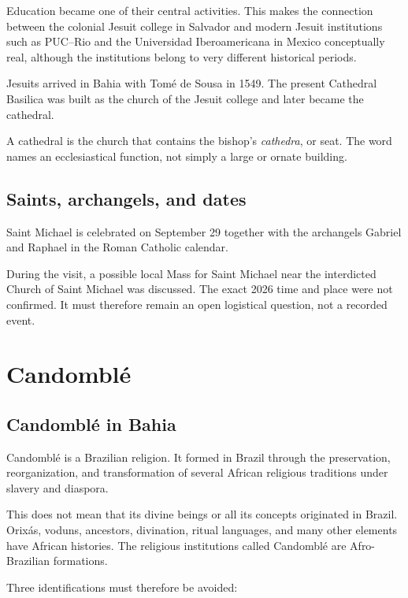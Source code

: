 Education became one of their central
activities.  This makes the connection
between the colonial Jesuit college in
Salvador and modern Jesuit institutions
such as PUC--Rio and the Universidad
Iberoamericana in Mexico conceptually
real, although the institutions belong to
very different historical periods.

Jesuits arrived in Bahia with Tom\'e de
Sousa in 1549.  The present Cathedral
Basilica was built as the church of the
Jesuit college and later became the
cathedral.

A cathedral is the church that contains
the bishop's \emph{cathedra}, or seat.  The
word names an ecclesiastical function,
not simply a large or ornate building.

\subsection{Saints, archangels, and dates}
\label{%
religion-section-saints-archangels-dates}

Saint Michael is celebrated on September
29 together with the archangels Gabriel
and Raphael in the Roman Catholic
calendar.

During the visit, a possible local Mass
for Saint Michael near the interdicted
Church of Saint Michael was discussed.
The exact 2026 time and place were not
confirmed.  It must therefore remain an
open logistical question, not a recorded
event.

\section{Candomblé}
\label{section-candomble}

\subsection{Candomblé in Bahia}
\label{religion-section-what-candomble-is}

Candombl\'e is a Brazilian religion.  It
formed in Brazil through the preservation,
reorganization, and transformation of
several African religious traditions under
slavery and diaspora.

This does not mean that its divine beings
or all its concepts originated in Brazil.
Orix\'as, voduns, ancestors, divination,
ritual languages, and many other elements
have African histories.  The religious
institutions called Candombl\'e are
Afro-Brazilian formations.

Three identifications must therefore be
avoided:

